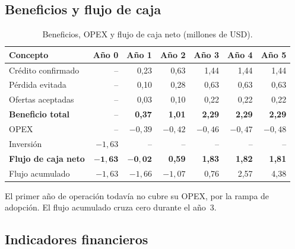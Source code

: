 \documentclass[11pt,a4paper]{article}
\begin{document}
\subsection{Beneficios y flujo de caja}

\begin{table}[H]
\centering
\caption{Beneficios, OPEX y flujo de caja neto (millones de USD).}
\small
\begin{tabularx}{\textwidth}{@{}X rrrrrr@{}}
\toprule
\textbf{Concepto} & \textbf{Año 0} & \textbf{Año 1} & \textbf{Año 2} & \textbf{Año 3} & \textbf{Año 4} & \textbf{Año 5} \\
\midrule
Crédito confirmado & -- & 0,23 & 0,63 & 1,44 & 1,44 & 1,44 \\
Pérdida evitada    & -- & 0,10 & 0,28 & 0,63 & 0,63 & 0,63 \\
Ofertas aceptadas  & -- & 0,03 & 0,10 & 0,22 & 0,22 & 0,22 \\
\midrule
\textbf{Beneficio total} & -- & \textbf{0,37} & \textbf{1,01} & \textbf{2,29} & \textbf{2,29} & \textbf{2,29} \\
OPEX               & -- & $-0{,}39$ & $-0{,}42$ & $-0{,}46$ & $-0{,}47$ & $-0{,}48$ \\
Inversión          & $-1{,}63$ & -- & -- & -- & -- & -- \\
\midrule
\textbf{Flujo de caja neto} & $\mathbf{-1{,}63}$ & $\mathbf{-0{,}02}$ & \textbf{0,59} & \textbf{1,83} & \textbf{1,82} & \textbf{1,81} \\
Flujo acumulado    & $-1{,}63$ & $-1{,}66$ & $-1{,}07$ & 0,76 & 2,57 & 4,38 \\
\bottomrule
\end{tabularx}
\end{table}

El primer año de operación todavía no cubre su OPEX, por la rampa de adopción. El flujo acumulado cruza cero durante el año~3.

\subsection{Indicadores financieros}
\end{document}
